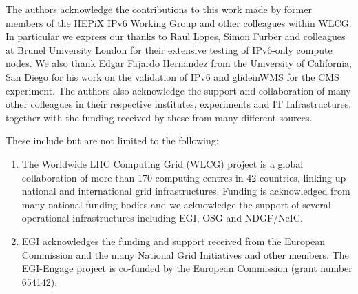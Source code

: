 
The authors acknowledge the contributions to this work made by former members of the HEPiX IPv6 Working Group and other colleagues within WLCG. In particular we express our thanks to Raul Lopes, Simon Furber and colleagues at Brunel University London for their extensive testing of IPv6-only compute nodes. We also thank Edgar Fajardo Hernandez from the University of California, San Diego for his work on the validation of IPv6 and glideinWMS for the CMS experiment. The authors also acknowledge the support and collaboration of many other colleagues in their respective institutes, experiments and IT Infrastructures, together with the funding received by these from many different sources. 

These include but are not limited to the following:
\begin{enumerate}

\item The Worldwide LHC Computing Grid (WLCG) project is a global collaboration of more than 170 computing centres in 42 countries, linking up national and international grid infrastructures. Funding is acknowledged from many national funding bodies and we acknowledge the support of several operational infrastructures including EGI, OSG and NDGF/NeIC.

\item EGI acknowledges the funding and support received from the European Commission and the many National Grid Initiatives and other members. The EGI-Engage project is co-funded by the European Commission (grant number 654142).

\end{enumerate}




